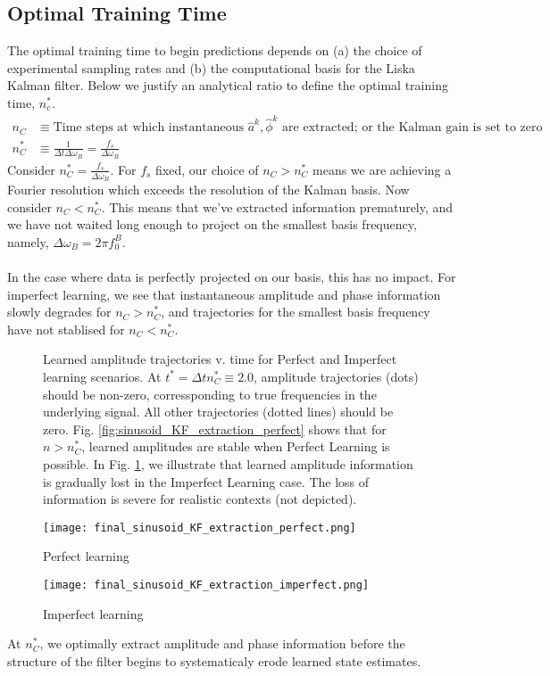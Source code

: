 \subsection{Optimal Training Time}
The optimal training time to begin predictions depends on (a) the choice of experimental sampling rates and (b) the computational basis for the Liska Kalman filter. Below we justify an analytical ratio to define the optimal training time, $n_c^*$. 
\begin{align}
n_C  &\equiv \text{Time steps at which instantaneous $\hat{a}^k, \hat{\phi}^k$ are extracted; or the Kalman gain is set to zero} \\
n_C^* &\equiv \frac{1}{\Delta t \Delta \omega_B} = \frac{f_s}{\Delta \omega_B} \label{eqn:sec:ap_liska_fixedbasis_nC}
\end{align}
Consider $n_C^* = \frac{f_s}{\Delta \omega_B}$.  For $f_s$ fixed, our choice of $n_C > n_C^* $ means we are achieving a Fourier resolution which exceeds the resolution of the Kalman basis. Now consider $n_C < n_C^*$. This means that we've extracted information prematurely, and we have not waited long enough to project on the smallest basis frequency, namely, $\Delta \omega_B = 2 \pi f_0^B$. 
\\
\\
In the case where data is perfectly projected on our basis, this has no impact. For imperfect learning, we see that instantaneous amplitude and phase information slowly degrades for $n_C > n_C^*$, and trajectories for the smallest basis frequency have not stablised for $n_C < n_C^*$.

\begin{figure}[h!]
	\centering
	\caption[Forecasting: Optimal time to extracting Kalman estimates during training]{Learned amplitude trajectories v. time for Perfect and Imperfect learning scenarios. At $ t^* = \Delta t n_C^* \equiv 2.0$, amplitude trajectories (dots) should be non-zero, corressponding to true frequencies in the underlying signal. All other trajectories  (dotted lines) should be zero. Fig. \ref{fig:sinusoid_KF_extraction_perfect} shows that for $n > n_C^*$, learned amplitudes are stable when Perfect Learning is possible. In Fig. \ref{fig:sinusoid_KF_extraction_imperfect}, we illustrate that learned amplitude information is gradually lost in the Imperfect Learning case. The loss of information is severe for realistic contexts (not depicted).}
		\texttt{[image: final\_sinusoid\_KF\_extraction\_perfect.png]}
		\caption{Perfect learning} \label{fig:sinusoid_KF_extraction_perfect}
		\texttt{[image: final\_sinusoid\_KF\_extraction\_imperfect.png]}
		\caption{Imperfect learning} \label{fig:sinusoid_KF_extraction_imperfect}
\end{figure}
\FloatBarrier
At $n_C^* $, we optimally extract amplitude and phase information before the structure of the filter begins to systematicaly erode learned state estimates.
\\
\\
